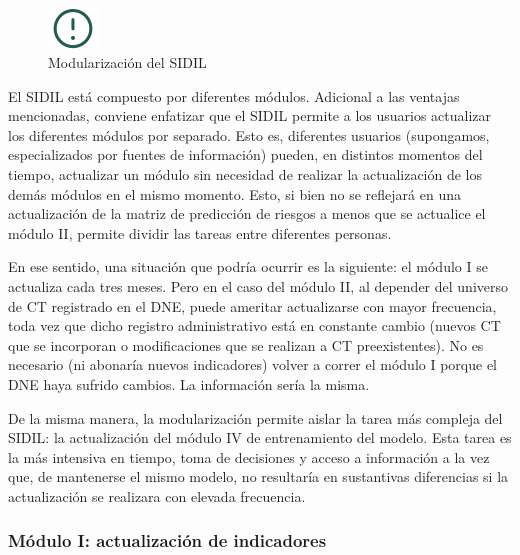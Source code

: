 \documentclass[
]{article}
\begin{document}
\begin{figure}
\includegraphics[width=50px,style="float:left; background-color: #f5f5f5; padding-right:1em"]{images-1/important-icon} \caption{Modularización del SIDIL}\label{fig:modularizacionSIDIL}
\end{figure}

\begin{rmdcomment}
El SIDIL está compuesto por diferentes módulos. Adicional a las ventajas
mencionadas, conviene enfatizar que el SIDIL permite a los usuarios
actualizar los diferentes módulos por separado. Esto es, diferentes
usuarios (supongamos, especializados por fuentes de información) pueden,
en distintos momentos del tiempo, actualizar un módulo sin necesidad de
realizar la actualización de los demás módulos en el mismo momento.
Esto, si bien no se reflejará en una actualización de la matriz de
predicción de riesgos a menos que se actualice el módulo II, permite
dividir las tareas entre diferentes personas.

En ese sentido, una situación que podría ocurrir es la siguiente: el
módulo I se actualiza cada tres meses. Pero en el caso del módulo II, al
depender del universo de CT registrado en el DNE, puede ameritar
actualizarse con mayor frecuencia, toda vez que dicho registro
administrativo está en constante cambio (nuevos CT que se incorporan o
modificaciones que se realizan a CT preexistentes). No es necesario (ni
abonaría nuevos indicadores) volver a correr el módulo I porque el DNE
haya sufrido cambios. La información sería la misma.

De la misma manera, la modularización permite aislar la tarea más
compleja del SIDIL: la actualización del módulo IV de entrenamiento del
modelo. Esta tarea es la más intensiva en tiempo, toma de decisiones y
acceso a información a la vez que, de mantenerse el mismo modelo, no
resultaría en sustantivas diferencias si la actualización se realizara
con elevada frecuencia.
\end{rmdcomment}

\hypertarget{moduloIexplicaciongeneral}{%
\subsubsection*{Módulo I: actualización de indicadores}\label{moduloIexplicaciongeneral}}
\end{document}

